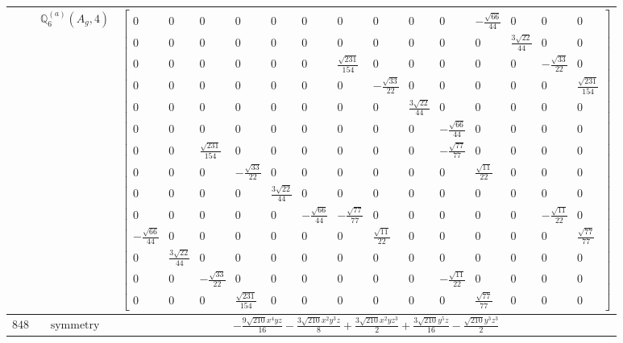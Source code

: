 \documentclass[fleqn,8pt,landscape]{jsarticle}
\begin{document}
\begin{longtable}{ccc}
$  $ & $ \mathbb{Q}_{6}^{(a)}(A_{g},4) $ & $ \begin{bmatrix} 0 & 0 & 0 & 0 & 0 & 0 & 0 & 0 & 0 & 0 & - \frac{\sqrt{66}}{44} & 0 & 0 & 0 \\ 0 & 0 & 0 & 0 & 0 & 0 & 0 & 0 & 0 & 0 & 0 & \frac{3 \sqrt{22}}{44} & 0 & 0 \\ 0 & 0 & 0 & 0 & 0 & 0 & \frac{\sqrt{231}}{154} & 0 & 0 & 0 & 0 & 0 & - \frac{\sqrt{33}}{22} & 0 \\ 0 & 0 & 0 & 0 & 0 & 0 & 0 & - \frac{\sqrt{33}}{22} & 0 & 0 & 0 & 0 & 0 & \frac{\sqrt{231}}{154} \\ 0 & 0 & 0 & 0 & 0 & 0 & 0 & 0 & \frac{3 \sqrt{22}}{44} & 0 & 0 & 0 & 0 & 0 \\ 0 & 0 & 0 & 0 & 0 & 0 & 0 & 0 & 0 & - \frac{\sqrt{66}}{44} & 0 & 0 & 0 & 0 \\ 0 & 0 & \frac{\sqrt{231}}{154} & 0 & 0 & 0 & 0 & 0 & 0 & - \frac{\sqrt{77}}{77} & 0 & 0 & 0 & 0 \\ 0 & 0 & 0 & - \frac{\sqrt{33}}{22} & 0 & 0 & 0 & 0 & 0 & 0 & \frac{\sqrt{11}}{22} & 0 & 0 & 0 \\ 0 & 0 & 0 & 0 & \frac{3 \sqrt{22}}{44} & 0 & 0 & 0 & 0 & 0 & 0 & 0 & 0 & 0 \\ 0 & 0 & 0 & 0 & 0 & - \frac{\sqrt{66}}{44} & - \frac{\sqrt{77}}{77} & 0 & 0 & 0 & 0 & 0 & - \frac{\sqrt{11}}{22} & 0 \\ - \frac{\sqrt{66}}{44} & 0 & 0 & 0 & 0 & 0 & 0 & \frac{\sqrt{11}}{22} & 0 & 0 & 0 & 0 & 0 & \frac{\sqrt{77}}{77} \\ 0 & \frac{3 \sqrt{22}}{44} & 0 & 0 & 0 & 0 & 0 & 0 & 0 & 0 & 0 & 0 & 0 & 0 \\ 0 & 0 & - \frac{\sqrt{33}}{22} & 0 & 0 & 0 & 0 & 0 & 0 & - \frac{\sqrt{11}}{22} & 0 & 0 & 0 & 0 \\ 0 & 0 & 0 & \frac{\sqrt{231}}{154} & 0 & 0 & 0 & 0 & 0 & 0 & \frac{\sqrt{77}}{77} & 0 & 0 & 0 \end{bmatrix} $ \\ \hline
$ 848 $ & $ \text{symmetry} $ & $ - \frac{9 \sqrt{210} x^{4} y z}{16} - \frac{3 \sqrt{210} x^{2} y^{3} z}{8} + \frac{3 \sqrt{210} x^{2} y z^{3}}{2} + \frac{3 \sqrt{210} y^{5} z}{16} - \frac{\sqrt{210} y^{3} z^{3}}{2} $ \\

\end{longtable}
\end{document}
